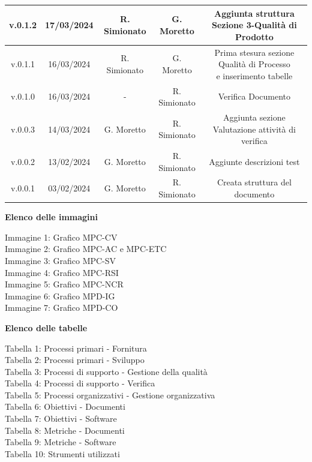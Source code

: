\documentclass[5pt]{article}
\begin{document}
\begin{table}[H]
{\begin{tabular}{|c|c|c|c|c|}
				\hline
				v.0.1.2 & 17/03/2024 & R. Simionato & G. Moretto & Aggiunta struttura Sezione 3-Qualità di Prodotto \\
				\hline
				v.0.1.1 & 16/03/2024 & R. Simionato & G. Moretto & \shortstack{Prima stesura sezione Qualità di Processo\\e inserimento tabelle} \\
				\hline
				v.0.1.0 & 16/03/2024 & - & R. Simionato & Verifica Documento \\
				\hline
				v.0.0.3 & 14/03/2024 & G. Moretto & R. Simionato & Aggiunta sezione Valutazione attività di verifica \\
				\hline
				v.0.0.2 & 13/02/2024 & G. Moretto & R. Simionato  &  Aggiunte descrizioni test\\
				\hline
				v.0.0.1 & 03/02/2024 & G. Moretto & R. Simionato  & Creata struttura del documento \\
				\hline
	   		\end{tabular}
		}
	 	\label{tab:conference}
    \end{table}

	\pagebreak
	\tableofcontents
	\pagebreak
	
	\begin{flushleft}
		\textbf{\Large Elenco delle immagini} 
		
		\begin{spacing}{1.5} 
			
			Immagine 1: Grafico MPC-CV \\
			Immagine 2: Grafico MPC-AC e MPC-ETC \\
			Immagine 3: Grafico MPC-SV \\
			Immagine 4: Grafico MPC-RSI \\
			Immagine 5: Grafico MPC-NCR \\
			Immagine 6: Grafico MPD-IG \\
			Immagine 7: Grafico MPD-CO
		\end{spacing}
	\end{flushleft}
	\pagebreak
	
	\begin{flushleft}
		\textbf{\Large Elenco delle tabelle}
		\begin{spacing}{1.5}
			
			Tabella 1: Processi primari - Fornitura \\
			Tabella 2: Processi primari - Sviluppo \\
			Tabella 3: Processi di supporto - Gestione della qualità \\
			Tabella 4: Processi di supporto - Verifica \\
			Tabella 5: Processi organizzativi - Gestione organizzativa \\
			Tabella 6: Obiettivi - Documenti \\
			Tabella 7: Obiettivi - Software \\
			Tabella 8: Metriche - Documenti \\
			Tabella 9: Metriche - Software \\
			Tabella 10: Strumenti utilizzati
		\end{spacing}
	\end{flushleft}
	
\end{document}
